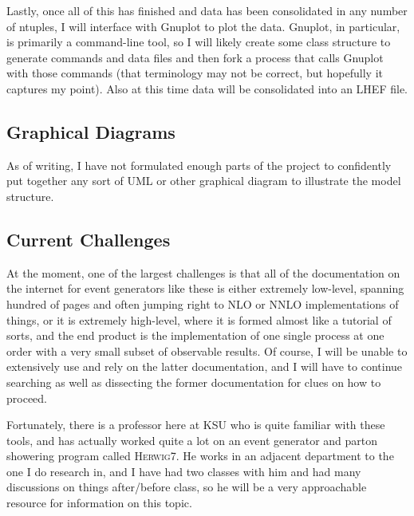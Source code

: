 Lastly, once all of this has finished and data has been consolidated in any number of ntuples, I will interface with Gnuplot to plot the data. Gnuplot, in particular, is primarily a command-line tool, so I will likely create some class structure to generate commands and data files and then fork a process that calls Gnuplot with those commands (that terminology may not be correct, but hopefully it captures my point). Also at this time data will be consolidated into an LHEF file.



\subsection{Graphical Diagrams}

As of writing, I have not formulated enough parts of the project to confidently put together any sort of UML or other graphical diagram to illustrate the model structure.


\subsection{Current Challenges}

At the moment, one of the largest challenges is that all of the documentation on the internet for event generators like these is either extremely low-level, spanning hundred of pages and often jumping right to NLO or NNLO implementations of things, or it is extremely high-level, where it is formed almost like a tutorial of sorts, and the end product is the implementation of one single process at one order with a very small subset of observable results. Of course, I will be unable to extensively use and rely on the latter documentation, and I will have to continue searching as well as dissecting the former documentation for clues on how to proceed.

Fortunately, there is a professor here at KSU who is quite familiar with these tools, and has actually worked quite a lot on an event generator and parton showering program called \textsc{Herwig7}. He works in an adjacent department to the one I do research in, and I have had two classes with him and had many discussions on things after/before class, so he will be a very approachable resource for information on this topic.




